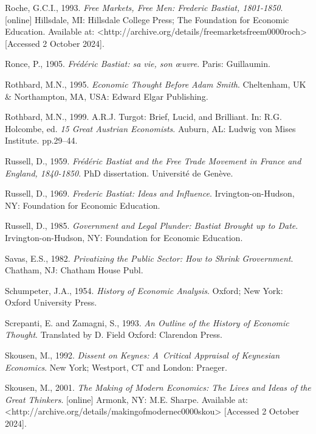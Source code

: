 Roche, G.C.I., 1993. \textit{Free Markets, Free Men: Frederic Bastiat, 1801-1850}. [online] Hillsdale, MI: Hillsdale College Press; The Foundation for Economic Education. Available at: {\textless}http://archive.org/details/freemarketsfreem0000roch{\textgreater} [Accessed 2 October 2024].



Ronce, P., 1905. \textit{Frédéric Bastiat: sa vie, son œuvre}. Paris: Guillaumin.



Rothbard, M.N., 1995. \textit{Economic Thought Before Adam Smith}. Cheltenham, UK \& Northampton, MA, USA: Edward Elgar Publishing.



Rothbard, M.N., 1999. A.R.J. Turgot: Brief, Lucid, and Brilliant. In: R.G. Holcombe, ed. \textit{15 Great Austrian Economists}. Auburn, AL: Ludwig von Mises Institute. pp.29–44.



Russell, D., 1959. \textit{Frédéric Bastiat and the Free Trade Movement in France and England, 1840-1850}. PhD dissertation. Université de Genève.



Russell, D., 1969. \textit{Frederic Bastiat: Ideas and Influence}. Irvington-on-Hudson, NY: Foundation for Economic Education.



Russell, D., 1985. \textit{Government and Legal Plunder: Bastiat Brought up to Date}. Irvington-on-Hudson, NY: Foundation for Economic Education.



Savas, E.S., 1982. \textit{Privatizing the Public Sector: How to Shrink Grovernment}. Chatham, NJ: Chatham House Publ.



Schumpeter, J.A., 1954. \textit{History of Economic Analysis}. Oxford; New York: Oxford University Press.



Screpanti, E. and Zamagni, S., 1993. \textit{An Outline of the History of Economic Thought}. Translated by D. Field Oxford: Clarendon Press.



Skousen, M., 1992. \textit{Dissent on Keynes: A~Critical Appraisal of Keynesian Economics}. New York; Westport, CT and London: Praeger.



Skousen, M., 2001. \textit{The Making of Modern Economics: The Lives and Ideas of the Great Thinkers}. [online] Armonk, NY: M.E. Sharpe. Available at: {\textless}http://archive.org/details/makingofmodernec0000skou{\textgreater} [Accessed 2 October 2024].



